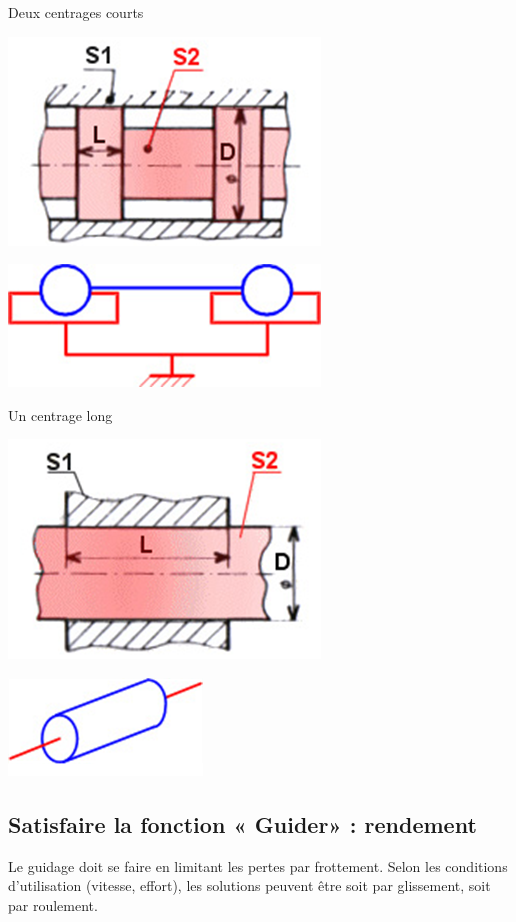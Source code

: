 \documentclass[11pt,oneside]{article}
\begin{document}
\noindent\begin{minipage}[c]{.43\linewidth}
\begin{center}
Deux centrages courts

\includegraphics[width=.5\textwidth]{png/fig02}

\includegraphics[width=.5\textwidth]{png/fig03}
\end{center}
\end{minipage}\hfill
\begin{minipage}[c]{.43\linewidth}
\begin{center}
Un centrage long

\includegraphics[width=.5\textwidth]{png/fig04}

\includegraphics[width=.5\textwidth]{png/fig05}

\end{center}
\end{minipage} 
\subsection{Satisfaire la fonction « Guider» : rendement}
Le guidage doit se faire en limitant les pertes par frottement. Selon les conditions d'utilisation (vitesse, effort), les solutions peuvent être soit par glissement, soit par roulement.
\end{document}

